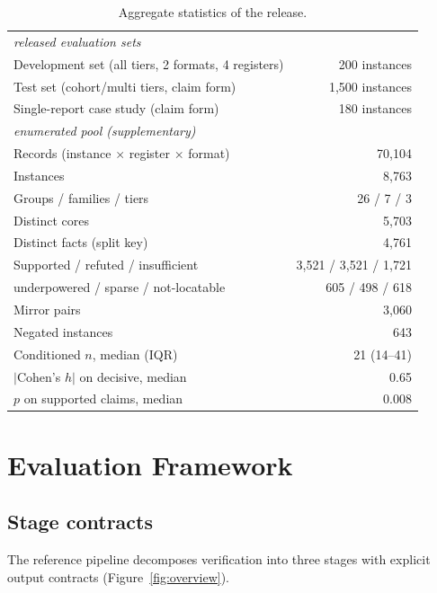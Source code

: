 \begin{table}[t]
\centering
\small
\begin{tabular}{lr}
\toprule
\multicolumn{2}{l}{\textit{released evaluation sets}} \\
Development set (all tiers, 2 formats, 4 registers) & 200 instances \\
Test set (cohort/multi tiers, claim form) & 1{,}500 instances \\
Single-report case study (claim form) & 180 instances \\
\midrule
\multicolumn{2}{l}{\textit{enumerated pool (supplementary)}} \\
Records (instance $\times$ register $\times$ format) & 70{,}104 \\
Instances & 8{,}763 \\
Groups / families / tiers & 26 / 7 / 3 \\
Distinct cores & 5{,}703 \\
Distinct facts (split key) & 4{,}761 \\
\midrule
Supported / refuted / insufficient & 3{,}521 / 3{,}521 / 1{,}721 \\
\quad underpowered / sparse / not-locatable & 605 / 498 / 618 \\
Mirror pairs & 3{,}060 \\
Negated instances & 643 \\
\midrule
Conditioned $n$, median (IQR) & 21 (14--41) \\
$|$Cohen's $h|$ on decisive, median & 0.65 \\
$p$ on supported claims, median & 0.008 \\
\bottomrule
\end{tabular}
\caption{Aggregate statistics of the release.}
\label{tab:totals}
\end{table}

\section{Evaluation Framework}
\label{sec:framework}

\subsection{Stage contracts}
\label{sec:contracts}

The reference pipeline decomposes verification into three stages with explicit
output contracts (Figure~\ref{fig:overview}).

